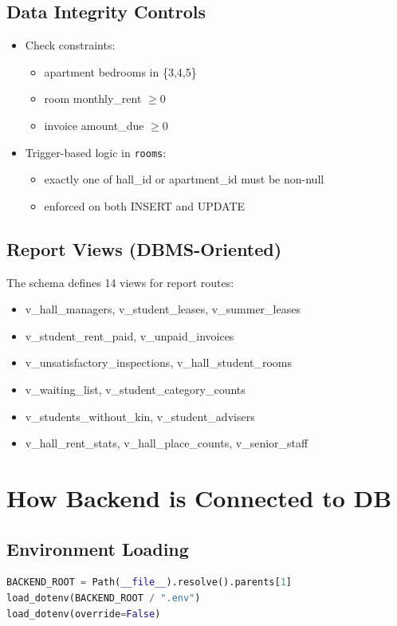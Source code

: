 \documentclass[11pt,a4paper]{article}
\begin{document}
\subsection{Data Integrity Controls}
\begin{itemize}
  \item Check constraints:
  \begin{itemize}
    \item apartment bedrooms in \{3,4,5\}
    \item room monthly\_rent \(\ge 0\)
    \item invoice amount\_due \(\ge 0\)
  \end{itemize}
  \item Trigger-based logic in \texttt{rooms}:
  \begin{itemize}
    \item exactly one of hall\_id or apartment\_id must be non-null
    \item enforced on both INSERT and UPDATE
  \end{itemize}
\end{itemize}

\subsection{Report Views (DBMS-Oriented)}
The schema defines 14 views for report routes:
\begin{itemize}
  \item v\_hall\_managers, v\_student\_leases, v\_summer\_leases
  \item v\_student\_rent\_paid, v\_unpaid\_invoices
  \item v\_unsatisfactory\_inspections, v\_hall\_student\_rooms
  \item v\_waiting\_list, v\_student\_category\_counts
  \item v\_students\_without\_kin, v\_student\_advisers
  \item v\_hall\_rent\_stats, v\_hall\_place\_counts, v\_senior\_staff
\end{itemize}

\section{How Backend is Connected to DB}
\subsection{Environment Loading}
\begin{lstlisting}[language=Python,caption={Environment initialization in config.py}]
BACKEND_ROOT = Path(__file__).resolve().parents[1]
load_dotenv(BACKEND_ROOT / ".env")
load_dotenv(override=False)
\end{lstlisting}
\end{document}
